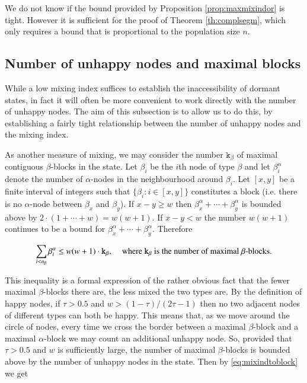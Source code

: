 \documentclass[11pt]{article}
\theoremstyle{plain}
\numberwithin{equation}{subsection}
\begin{document}
We do not know if the bound provided by
Proposition \ref{prop:maxmixindor} is tight.
However it is 
sufficient for the proof of Theorem \ref{th:complsegm}, which only requires
a bound that is proportional to the population size $n$.

\subsection{Number of unhappy nodes and maximal blocks}\label{se:nounhapblo}
While a low mixing index suffices to establish the inaccessibility 
of dormant states, in fact it will often be more convenient to work 
directly with the number of unhappy nodes. 
The aim of this subsection is to allow us to do this, 
by establishing a fairly tight relationship between the number of unhappy nodes and the mixing index.  

As another measure of mixing, we may consider the number
$\mathtt{k}_{\beta}$ of maximal contiguous $\beta$-blocks in the state. 
Let $\beta_i$ be the $i$th  node of type $\beta$ 
and let $\beta_i^{\alpha}$ denote the number of  $\alpha$-nodes 
in the neighbourhood
around $\beta_i$. Let $[x,y]$ be a finite interval of integers such that 
$\{\beta_i : i\in [x,y] \}$ constitutes a block (i.e. there is no $\alpha$-node
between $\beta_x$ and $\beta_y$). 
If $x-y\geq w$ then $\beta^{\alpha}_x+\cdots+\beta^{\alpha}_y$ 
is bounded above by $2\cdot(1+\cdots+w)=w(w+1)$.
If $x-y< w$ the number $w(w+1)$ continues to be a bound for 
$\beta^{\alpha}_x+\cdots+\beta^{\alpha}_y$. Therefore

\begin{equation}\label{eq:mixindtoblock}
\sum_{i<n_\beta} \beta_i^{\alpha} \leq w(w+1) \cdot \mathtt{k}_{\beta},\hspace{0.4cm}\textrm{where $\mathtt{k}_{\beta}$ is the number of maximal $\beta$-blocks.}
\end{equation}

This inequality is a formal expression of the rather obvious 
fact that the fewer maximal $\beta$-blocks there are, the less mixed the two types are.
By the definition of happy nodes,
if $\tau>0.5$ and $w>(1-\tau)/(2\tau-1)$ then  no
two adjacent nodes of different types can both be happy.
This means that, as we move around the circle of nodes, 
every time we cross the border between 
a maximal $\beta$-block and a maximal $\alpha$-block we may count an 
additional unhappy node.
So, provided that $\tau>0.5$ and  $w$ is sufficiently large,
the number of maximal $\beta$-blocks 
is bounded above by the number of unhappy nodes in the state.
Then by \eqref{eq:mixindtoblock} we get
\end{document}
